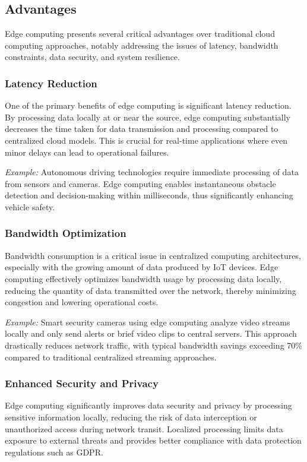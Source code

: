 \documentclass[runningheads]{llncs}
\begin{document}
\subsection{Advantages}

Edge computing presents several critical advantages over traditional cloud computing approaches, notably addressing the issues of latency, bandwidth constraints, data security, and system resilience.

\subsubsection{Latency Reduction}
One of the primary benefits of edge computing is significant latency reduction. By processing data locally at or near the source, edge computing substantially decreases the time taken for data transmission and processing compared to centralized cloud models. This is crucial for real-time applications where even minor delays can lead to operational failures.

\noindent\textit{Example:} Autonomous driving technologies require immediate processing of data from sensors and cameras. Edge computing enables instantaneous obstacle detection and decision-making within milliseconds, thus significantly enhancing vehicle safety.

\subsubsection{Bandwidth Optimization}
Bandwidth consumption is a critical issue in centralized computing architectures, especially with the growing amount of data produced by IoT devices. Edge computing effectively optimizes bandwidth usage by processing data locally, reducing the quantity of data transmitted over the network, thereby minimizing congestion and lowering operational costs.

\noindent\textit{Example:} Smart security cameras using edge computing analyze video streams locally and only send alerts or brief video clips to central servers. This approach drastically reduces network traffic, with typical bandwidth savings exceeding 70\% compared to traditional centralized streaming approaches.

\subsubsection{Enhanced Security and Privacy}
Edge computing significantly improves data security and privacy by processing sensitive information locally, reducing the risk of data interception or unauthorized access during network transit. Localized processing limits data exposure to external threats and provides better compliance with data protection regulations such as GDPR.
\end{document}
